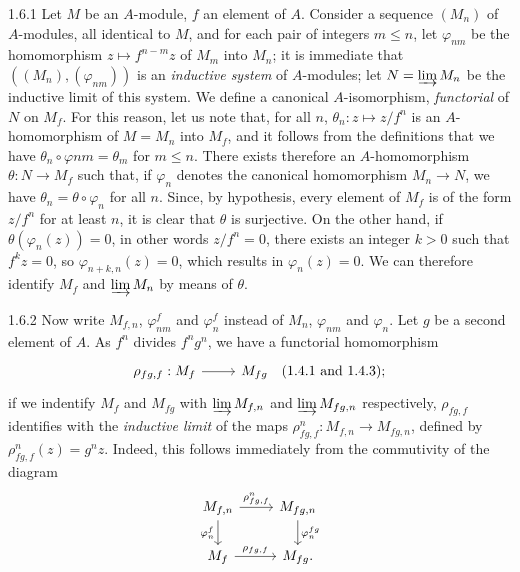 \documentclass[../main.tex]{subfiles}
\begin{document}
\begin{cx}{1.6.1}
Let $M$ be an $A$-module, $f$ an element of $A$. Consider a sequence
$(M_n)$ of $A$-modules, all identical to $M$, and for each pair of integers
$m\leq n$, let $\varphi_{nm}$ be the homomorphism $z\mapsto f^{n-m}z$ of $M_m$
into $M_n$; it is immediate that $((M_n),(\varphi_{nm}))$ is an \emph{inductive system}
of $A$-modules; let $N=\varinjlim M_n$ be the inductive limit of this system. We define
a canonical $A$-isomorphism, \emph{functorial} of $N$ on $M_f$. For this reason, let us
note that, for all $n$, $\theta_n:z\mapsto z/f^n$ is an $A$-homomorphism of $M=M_n$ into
$M_f$, and it follows from the definitions that we have $\theta_n\circ\varphi{nm}=\theta_m$
for $m\leq n$. There exists therefore an $A$-homomorphism $\theta:N\to M_f$ such that, if
$\varphi_n$ denotes the canonical homomorphism $M_n\to N$, we have $\theta_n=\theta\circ\varphi_n$
for all $n$. Since, by hypothesis, every element of $M_f$ is of the form $z/f^n$ for at least $n$,
it is clear that $\theta$ is surjective. On the other hand, if $\theta(\varphi_n(z))=0$,
in other words $z/f^n=0$, there exists an integer $k>0$ such that $f^k z=0$, so $\varphi_{n+k,n}(z)=0$,
which results in $\varphi_n(z)=0$. We can therefore identify $M_f$ and $\varinjlim M_n$ by means
of $\theta$.
\end{cx}

\begin{cx}{1.6.2}
Now write $M_{f,n}$, $\varphi_{nm}^f$ and $\varphi_n^f$ instead of $M_n$, $\varphi_{nm}$ and
$\varphi_n$. Let $g$ be a second element of $A$. As $f^n$ divides $f^n g^n$, we have a functorial
homomorphism
\[\TI
  \rho_{fg,f}:M_f\ar[r] & M_{fg}\quad(1.4.1\text{ and }1.4.3);
\TE\]
if we indentify $M_f$ and $M_{fg}$ with $\varinjlim M_{f,n}$ and $\varinjlim M_{fg,n}$
respectively, $\rho_{fg,f}$ identifies with the \emph{inductive limit} of the maps
$\rho_{fg,f}^n:M_{f,n}\to M_{fg,n}$, defined by $\rho_{fg,f}^n(z)=g^n z$. Indeed, this follows
immediately from the commutivity of the diagram
\[\TI
  M_{f,n}\ar[r,"\rho_{fg,f}^n"]\ar[d,"\varphi_n^f"'] & M_{fg,n}\ar[d,"\varphi_n^{fg}"]\\
  M_f\ar[r,"\rho_{fg,f}"] & M_{fg}.
\TE\]
\end{cx}
\end{document}
